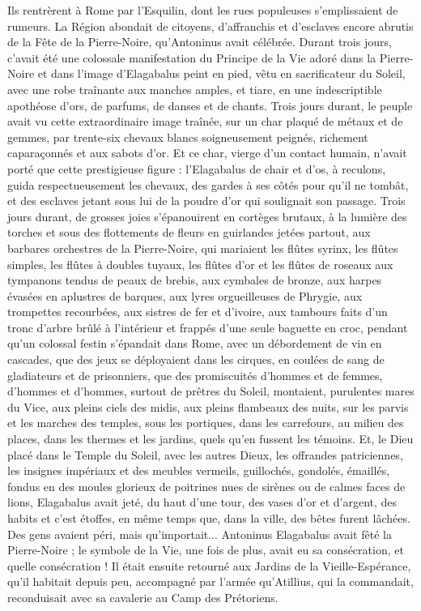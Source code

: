 \documentclass[a4paper, 11pt, oneside, polutonikogreek, french]{article}
\begin{document}
Ils rentrèrent à Rome par l'Esquilin, dont les rues populeuses s'emplissaient de rumeurs. La Région abondait de citoyens, d'affranchis et d'esclaves encore abrutis de la Fête de la Pierre-Noire, qu'Antoninus avait célébrée. Durant trois jours, c'avait été une colossale manifestation du Principe de la Vie adoré dans la Pierre-Noire et dans l'image d'Elagabalus peint en pied, vêtu en sacrificateur du Soleil, avec une robe traînante aux manches amples, et tiare, en une indescriptible apothéose d'ors, de parfums, de danses et de chants. Trois jours durant, le peuple avait vu cette extraordinaire image traînée, sur un char plaqué de métaux et de gemmes, par trente-six chevaux blancs soigneusement peignés, richement caparaçonnés et aux sabots d'or. Et ce char, vierge d'un contact humain, n'avait porté que cette prestigieuse figure : l'Elagabalus de chair et d'os, à reculons, guida respectueusement les chevaux, des gardes à ses côtés pour qu'il ne tombât, et des esclaves jetant sous lui de la poudre d'or qui soulignait son passage. Trois jours durant, de grosses joies s'épanouirent en cortèges brutaux, à la lumière des torches et sous des flottements de fleurs en guirlandes jetées partout, aux barbares orchestres de la Pierre-Noire, qui mariaient les flûtes syrinx, les flûtes simples, les flûtes à doubles tuyaux, les flûtes d'or et les flûtes de roseaux aux tympanons tendus de peaux de brebis, aux cymbales de bronze, aux harpes évasées en aplustres de barques, aux lyres orgueilleuses de Phrygie, aux trompettes recourbées, aux sistres de fer et d'ivoire, aux tambours faits d'un tronc d'arbre brûlé à l'intérieur et frappés d'une seule baguette en croc, pendant qu'un colossal festin s'épandait dans Rome, avec un débordement de vin en cascades, que des jeux se déployaient dans les cirques, en coulées de sang de gladiateurs et de prisonniers, que des promiscuités d'hommes et de femmes, d'hommes et d'hommes, surtout de prêtres du Soleil, montaient, purulentes mares du Vice, aux pleins ciels des midis, aux pleins flambeaux des nuits, sur les parvis et les marches des temples, sous les portiques, dans les carrefours, au milieu des places, dans les thermes et les jardins, quels qu'en fussent les témoins. Et, le Dieu placé dans le Temple du Soleil, avec les autres Dieux, les offrandes patriciennes, les insignes impériaux et des meubles vermeils, guillochés, gondolés, émaillés, fondus en des moules glorieux de poitrines nues de sirènes ou de calmes faces de lions, Elagabalus avait jeté, du haut d'une tour, des vases d'or et d'argent, des habits et c'est étoffes, en même temps que, dans la ville, des bêtes furent lâchées. Des gens avaient péri, mais qu'importait... Antoninus Elagabalus avait fêté la Pierre-Noire ; le symbole de la Vie, une fois de plus, avait eu sa consécration, et quelle consécration ! Il était ensuite retourné aux Jardins de la Vieille-Espérance, qu'il habitait depuis peu, accompagné par l'armée qu'Atillius, qui la commandait, reconduisait avec sa cavalerie au Camp des Prétoriens.
\end{document}
